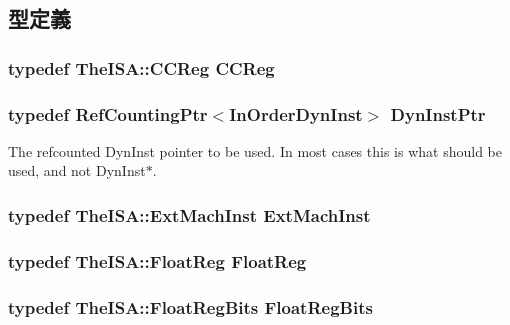 \subsection{型定義}
\hypertarget{classInOrderDynInst_a0c9de550a32808e6a25b54b6c791d5ab}{
\subsubsection[{CCReg}]{\setlength{\rightskip}{0pt plus 5cm}typedef TheISA::CCReg {\bf CCReg}}}
\label{classInOrderDynInst_a0c9de550a32808e6a25b54b6c791d5ab}
\hypertarget{classInOrderDynInst_a6c43cc7218ba606c2e7843dc48b21b6e}{
\subsubsection[{DynInstPtr}]{\setlength{\rightskip}{0pt plus 5cm}typedef {\bf RefCountingPtr}$<${\bf InOrderDynInst}$>$ {\bf DynInstPtr}}}
\label{classInOrderDynInst_a6c43cc7218ba606c2e7843dc48b21b6e}
The refcounted DynInst pointer to be used. In most cases this is what should be used, and not DynInst$\ast$. \hypertarget{classInOrderDynInst_a5605d4fc727eae9e595325c90c0ec108}{
\subsubsection[{ExtMachInst}]{\setlength{\rightskip}{0pt plus 5cm}typedef TheISA::ExtMachInst {\bf ExtMachInst}}}
\label{classInOrderDynInst_a5605d4fc727eae9e595325c90c0ec108}
\hypertarget{classInOrderDynInst_a75484259f1855aabc8d74c6eb1cfe186}{
\subsubsection[{FloatReg}]{\setlength{\rightskip}{0pt plus 5cm}typedef TheISA::FloatReg {\bf FloatReg}}}
\label{classInOrderDynInst_a75484259f1855aabc8d74c6eb1cfe186}
\hypertarget{classInOrderDynInst_aab5eeae86499f9bfe15ef79360eccc64}{
\subsubsection[{FloatRegBits}]{\setlength{\rightskip}{0pt plus 5cm}typedef TheISA::FloatRegBits {\bf FloatRegBits}}}
